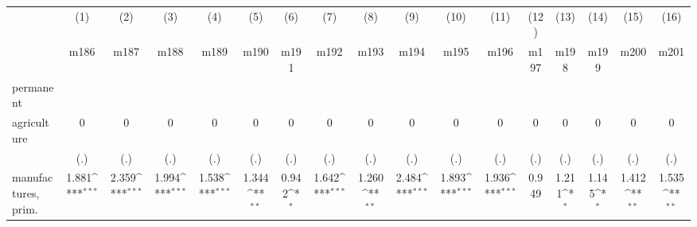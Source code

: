 {
\def\sym#1{\ifmmode^{#1}\else\(^{#1}\)\fi}
\begin{tabular}{l*{16}{c}}
\hline\hline
                    &\multicolumn{1}{c}{(1)}&\multicolumn{1}{c}{(2)}&\multicolumn{1}{c}{(3)}&\multicolumn{1}{c}{(4)}&\multicolumn{1}{c}{(5)}&\multicolumn{1}{c}{(6)}&\multicolumn{1}{c}{(7)}&\multicolumn{1}{c}{(8)}&\multicolumn{1}{c}{(9)}&\multicolumn{1}{c}{(10)}&\multicolumn{1}{c}{(11)}&\multicolumn{1}{c}{(12)}&\multicolumn{1}{c}{(13)}&\multicolumn{1}{c}{(14)}&\multicolumn{1}{c}{(15)}&\multicolumn{1}{c}{(16)}\\
                    &\multicolumn{1}{c}{m186}&\multicolumn{1}{c}{m187}&\multicolumn{1}{c}{m188}&\multicolumn{1}{c}{m189}&\multicolumn{1}{c}{m190}&\multicolumn{1}{c}{m191}&\multicolumn{1}{c}{m192}&\multicolumn{1}{c}{m193}&\multicolumn{1}{c}{m194}&\multicolumn{1}{c}{m195}&\multicolumn{1}{c}{m196}&\multicolumn{1}{c}{m197}&\multicolumn{1}{c}{m198}&\multicolumn{1}{c}{m199}&\multicolumn{1}{c}{m200}&\multicolumn{1}{c}{m201}\\
\hline
permanent           &                     &                     &                     &                     &                     &                     &                     &                     &                     &                     &                     &                     &                     &                     &                     &                     \\
agriculture         &           0         &           0         &           0         &           0         &           0         &           0         &           0         &           0         &           0         &           0         &           0         &           0         &           0         &           0         &           0         &           0         \\
                    &         (.)         &         (.)         &         (.)         &         (.)         &         (.)         &         (.)         &         (.)         &         (.)         &         (.)         &         (.)         &         (.)         &         (.)         &         (.)         &         (.)         &         (.)         &         (.)         \\
[1em]
manufactures, prim. &       1.881\sym{***}&       2.359\sym{***}&       1.994\sym{***}&       1.538\sym{***}&       1.344\sym{**} &       0.942\sym{*}  &       1.642\sym{***}&       1.260\sym{**} &       2.484\sym{***}&       1.893\sym{***}&       1.936\sym{***}&       0.949         &       1.211\sym{*}  &       1.145\sym{*}  &       1.412\sym{**} &       1.535\sym{**} \\

\end{tabular}}
